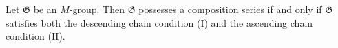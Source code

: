 Let $\mathfrak{G}$ be an $M$-group. Then $\mathfrak{G}$ possesses a composition series if and only if $\mathfrak{G}$ satisfies both the descending chain condition (I) and the ascending chain condition (II).
